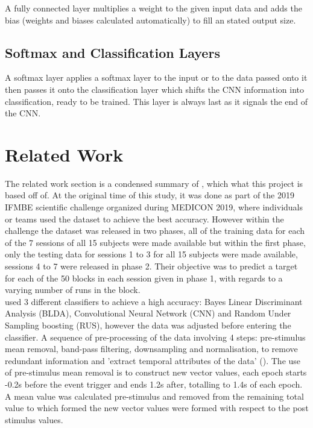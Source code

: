 A fully connected layer multiplies a weight to the given input data and adds the bias (weights and biases calculated automatically) to fill an stated output size.

\subsection{Softmax and Classification Layers}

A softmax layer applies a softmax layer to the input or to the data passed onto it then passes it onto the classification layer which shifts the CNN information into classification, ready to be trained. This layer is always last as it signals the end of the CNN.

\section{Related Work}
\label{Related Work Section}

The related work section is a condensed summary of \cite{PalaniPaper}, which what this project is based off of. At the original time of this study, it was done as part of the 2019 IFMBE scientific challenge organized during MEDICON 2019, where individuals or teams used the dataset to achieve the best accuracy. However within the challenge the dataset was released in two phases, all of the training data for each of the 7 sessions of all 15 subjects were made available but within the first phase, only the testing data for sessions 1 to 3 for all 15 subjects were made available, sessions 4 to 7 were released in phase 2. Their objective was to predict a target for each of the 50 blocks in each session given in phase 1, with regards to a varying number of runs in the block. \\

\cite{PalaniPaper} used 3 different classifiers to achieve a high accuracy: Bayes Linear Discriminant Analysis (BLDA), Convolutional Neural Network (CNN) and Random Under Sampling boosting (RUS), however the data was adjusted before entering the classifier. A sequence of pre-processing of the data involving 4 steps: pre-stimulus mean removal, band-pass filtering, downsampling and normalisation, to remove redundant information and 'extract temporal attributes of the data' (\cite{PalaniPaper}).
The use of pre-stimulus mean removal is to construct new vector values, each epoch starts -0.2s before the event trigger and ends 1.2s after, totalling to 1.4s of each epoch. A mean value was calculated pre-stimulus and removed from the remaining total value to which formed the new vector values were formed with respect to the post stimulus values. \\

